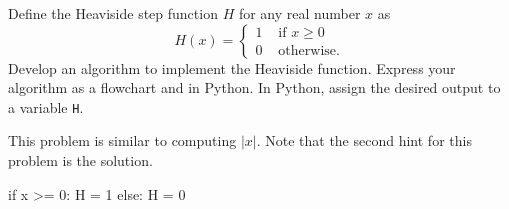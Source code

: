 \documentclass{ximera}
\begin{document}
\begin{question}
Define the Heaviside step function $H$ for any real number $x$ as
	$$H(x)=\begin{cases} 1 &\text{ if $x\geq 0$}\\
		0 &\text{ otherwise.}
	\end{cases}$$
Develop an algorithm to implement the Heaviside function. Express your algorithm as a flowchart and in Python. In Python, assign the desired output to a variable \verb|H|.
	\begin{hint}
		This problem is similar to computing $|x|$. Note that the second hint for this problem is the solution.
	\end{hint}
	\begin{hint}
	\begin{center}

	\end{center}
\begin{sageCell}
if x >= 0:
        H = 1
else:
        H = 0
\end{sageCell}
	\end{hint}
\end{question}
\end{document}
